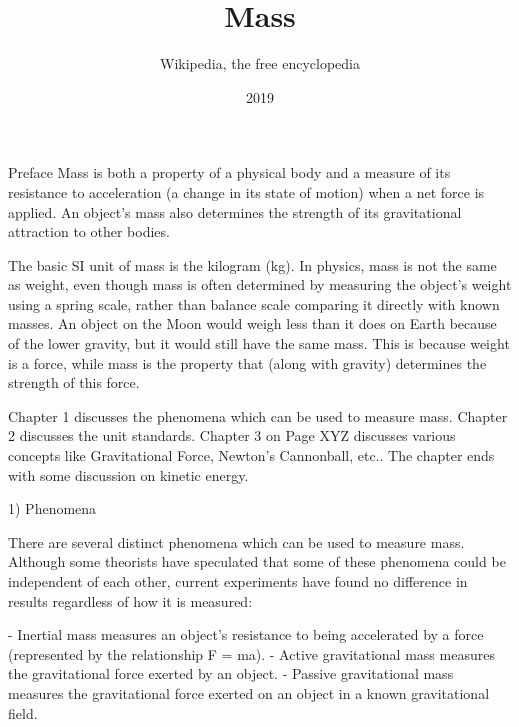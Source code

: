 \documentclass{book}
\title{Mass}
\author{Wikipedia, the free encyclopedia}
\date{2019}
\begin{document}
    \maketitle


    Preface
    Mass is both a property of a physical body and a measure of its resistance to acceleration (a change in its state of motion) when a net force is applied. An object's mass also determines the strength of its gravitational attraction to other bodies.
    
    The basic SI unit of mass is the kilogram (kg). In physics, mass is not the same as weight, even though mass is often determined by measuring the object's weight using a spring scale, rather than balance scale comparing it directly with known masses. An object on the Moon would weigh less than it does on Earth because of the lower gravity, but it would still have the same mass. This is because weight is a force, while mass is the property that (along with gravity) determines the strength of this force.
    
    Chapter 1 discusses the phenomena which can be used to measure mass. Chapter 2 discusses the unit standards. Chapter 3 on Page XYZ discusses various concepts like Gravitational Force, Newton's Cannonball, etc.. The chapter ends with some discussion on kinetic energy.


    1) Phenomena
    
    There are several distinct phenomena which can be used to measure mass. Although some theorists have speculated that some of these phenomena could be independent of each other, current experiments have found no difference in results regardless of how it is measured:
    
    - Inertial mass measures an object's resistance to being accelerated by a force (represented by the relationship F = ma).
    - Active gravitational mass measures the gravitational force exerted by an object.
    - Passive gravitational mass measures the gravitational force exerted on an object in a known gravitational field.
        
\end{document}
